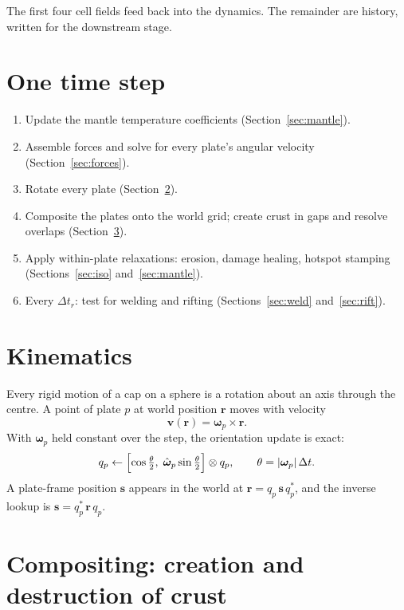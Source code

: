 \documentclass[11pt,a4paper]{article}
\newcommand{\vect}[1]{\bm{#1}}
\newcommand{\rr}{\vect{r}}
\newcommand{\om}{\vect{\omega}}
\begin{document}
The first four cell fields feed back into the dynamics. The remainder are
history, written for the downstream stage.

\section{One time step}

\begin{enumerate}[leftmargin=*]
\item Update the mantle temperature coefficients (Section~\ref{sec:mantle}).
\item Assemble forces and solve for every plate's angular velocity
(Section~\ref{sec:forces}).
\item Rotate every plate (Section~\ref{sec:kin}).
\item Composite the plates onto the world grid; create crust in gaps and
resolve overlaps (Section~\ref{sec:composite}).
\item Apply within-plate relaxations: erosion, damage healing, hotspot
stamping (Sections~\ref{sec:iso} and~\ref{sec:mantle}).
\item Every $\Delta t_r$: test for welding and rifting
(Sections~\ref{sec:weld} and~\ref{sec:rift}).
\end{enumerate}

\section{Kinematics}\label{sec:kin}

Every rigid motion of a cap on a sphere is a rotation about an axis through
the centre. A point of plate $p$ at world position $\rr$ moves with velocity
\begin{equation}
\vect{v}(\rr) = \om_p \times \rr .
\end{equation}
With $\om_p$ held constant over the step, the orientation update is exact:
\begin{equation}
q_p \leftarrow
\Bigl[\cos\tfrac{\theta}{2},\; \hat{\om}_p \sin\tfrac{\theta}{2}\Bigr] \otimes q_p,
\qquad \theta = |\om_p|\,\Delta t .
\end{equation}
A plate-frame position $\vect{s}$ appears in the world at
$\rr = q_p\,\vect{s}\,q_p^{*}$, and the inverse lookup is
$\vect{s} = q_p^{*}\,\rr\,q_p$.

\section{Compositing: creation and destruction of crust}\label{sec:composite}
\end{document}
